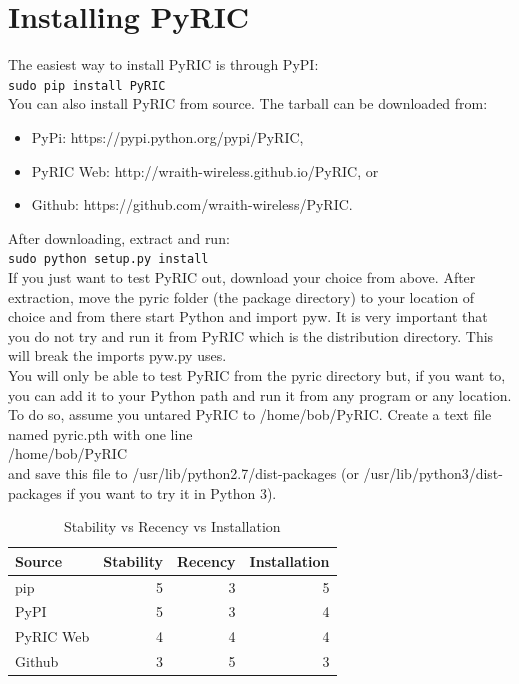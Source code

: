 \documentclass[11pt]{article}
\begin{document}
\section{Installing PyRIC}\label{sec:installing}
The easiest way to install PyRIC is through PyPI:\\

    \texttt{sudo pip install PyRIC}\\

You can also install PyRIC from source. The tarball can be downloaded from:

\begin{itemize}
\item PyPi: https://pypi.python.org/pypi/PyRIC,
\item PyRIC Web: http://wraith-wireless.github.io/PyRIC, or
\item Github: https://github.com/wraith-wireless/PyRIC.
\end{itemize}

After downloading, extract and run:\\

	\texttt{sudo python setup.py install}\\

If you just want to test PyRIC out, download your choice from above. After 
extraction, move the pyric folder (the package directory) to your location of 
choice and from there start Python and import pyw. It is very important that you
do not try and run it from PyRIC which is the distribution directory. This will 
break the imports pyw.py uses. \\

You will only be able to test PyRIC from the pyric directory but, if you want to,
you can add it to your Python path and run it from any program or any location.
To do so, assume you untared PyRIC to /home/bob/PyRIC. Create a text file named
pyric.pth with one line \\

    /home/bob/PyRIC \\

and save this file to /usr/lib/python2.7/dist-packages (or 
/usr/lib/python3/dist-packages if you want to try it in Python 3).

\begin{table}
\begin{center}
\begin{tabular}{| l | r | r | r |}
\hline
Source & Stability & Recency & Installation \\
\hline
pip & 5 & 3 & 5\\
\hline
PyPI & 5 & 3 & 4\\
\hline
PyRIC Web & 4 & 4 & 4\\
\hline
Github & 3 & 5 & 3\\
\hline
\end{tabular}
\caption{Stability vs Recency vs Installation}
\end{center}
\label{tab:install}
\end{table}
\end{document}
